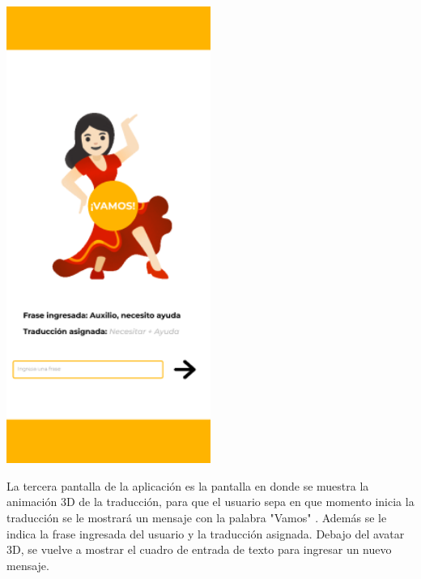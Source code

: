 \begin{center}
    \includegraphics[width=0.5\textwidth]{Images/Cap 3/Pantalla3.png}
\end{center}

La tercera pantalla de la aplicación es la pantalla en donde se muestra la animación 3D de la traducción, para que el usuario sepa en que momento inicia la traducción se le mostrará un mensaje con la palabra "Vamos" . Además se le indica la frase ingresada del usuario y la traducción asignada. Debajo del avatar 3D, se vuelve a mostrar el cuadro de entrada de texto para ingresar un nuevo mensaje.

